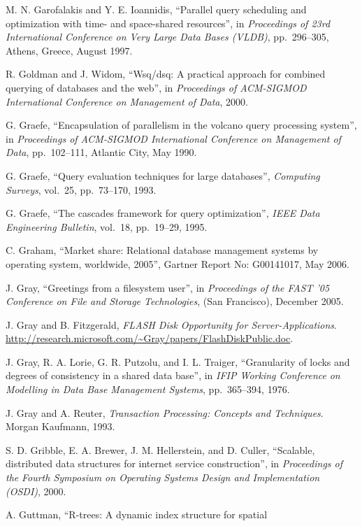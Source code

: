 \documentclass[b5paper,11pt,twoside,openright]{book}
\begin{document}
\begin{enumerate}[label={[\arabic*]}]
  M. N. Garofalakis and Y. E. Ioannidis, ``Parallel query scheduling and
  optimization with time- and space-shared resources'', in
  \emph{Proceedings of 23rd International Conference on Very Large Data
  Bases (VLDB)}, pp.~296--305, Athens, Greece, August 1997.
\item
  R. Goldman and J. Widom, ``Wsq/dsq: A practical approach for combined
  querying of databases and the web'', in \emph{Proceedings of
  ACM-SIGMOD International Conference on Management of Data}, 2000.
\item
  G. Graefe, ``Encapsulation of parallelism in the volcano query
  processing system'', in \emph{Proceedings of ACM-SIGMOD International
  Conference on Management of Data}, pp.~102--111, Atlantic City, May
  1990.
\item
  G. Graefe, ``Query evaluation techniques for large databases'',
  \emph{Computing Surveys}, vol.~25, pp.~73--170, 1993.
\item
  G. Graefe, ``The cascades framework for query optimization'',
  \emph{IEEE Data Engineering Bulletin}, vol.~18, pp.~19--29, 1995.
\item
  C. Graham, ``Market share: Relational database management systems by
  operating system, worldwide, 2005'', Gartner Report No: G00141017, May
  2006.
\item
  J. Gray, ``Greetings from a filesystem user'', in \emph{Proceedings of
  the FAST '05} \emph{Conference on File and Storage Technologies}, (San
  Francisco), December 2005.
\item
  J. Gray and B. Fitzgerald, \emph{FLASH Disk Opportunity for
  Server-Applications}.
  \url{http://research.microsoft.com/~Gray/papers/FlashDiskPublic.doc}.
\item
  J. Gray, R. A. Lorie, G. R. Putzolu, and I. L. Traiger, ``Granularity
  of locks and degrees of consistency in a shared data base'', in
  \emph{IFIP Working Conference} \emph{on Modelling in Data Base
  Management Systems}, pp.~365--394, 1976.
\item
  J. Gray and A. Reuter, \emph{Transaction Processing: Concepts and
  Techniques}. Morgan Kaufmann, 1993.
\item
  S. D. Gribble, E. A. Brewer, J. M. Hellerstein, and D. Culler,
  ``Scalable, distributed data structures for internet service
  construction'', in \emph{Proceedings of the} \emph{Fourth Symposium on
  Operating Systems Design and Implementation (OSDI)}, 2000.
\item
  A. Guttman, ``R-trees: A dynamic index structure for spatial

\end{enumerate}
\end{document}
